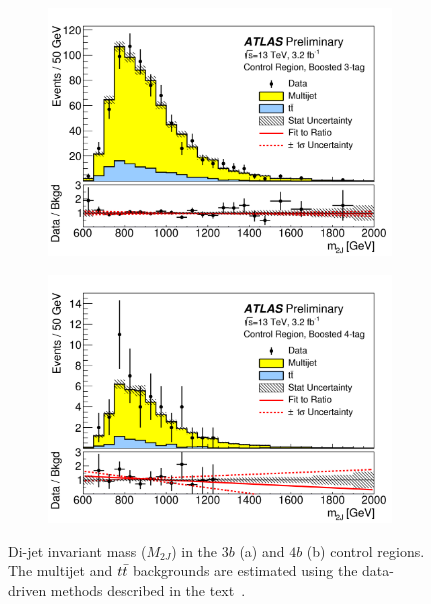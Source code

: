 \begin{figure}[h!]
  \centering
  \captionsetup{justification=centering}

   \begin{subfigure}[t]{0.5\textwidth}
        \centering
        \includegraphics[width=\textwidth]{figures/3b_control}
        \caption{}
    \end{subfigure}%
    \begin{subfigure}[t]{0.5\textwidth}
        \centering
        \includegraphics[width=\textwidth]{figures/4b_control}
        \caption{}
    \end{subfigure}

   \caption{Di-jet invariant mass ($M_{2J}$) in the $3b$ (a) and $4b$ (b) control regions. The multijet and $t\bar{t}$ backgrounds are estimated using the data-driven methods described in the text~\cite{4bconf}.}
  \label{fig:4b_control}
\end{figure}

